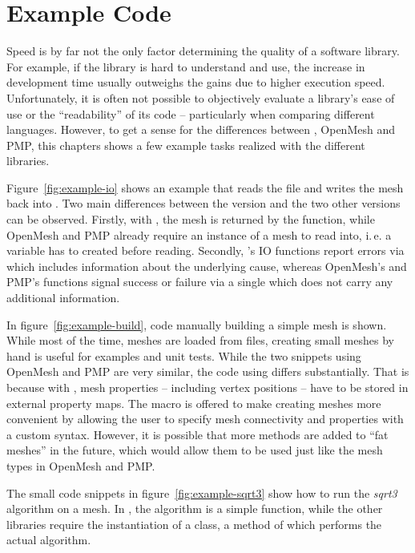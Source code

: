 \newpage
\section{Example Code}

Speed is by far not the only factor determining the quality of a software library.
For example, if the library is hard to understand and use, the increase in development time usually outweighs the gains due to higher execution speed.
Unfortunately, it is often not possible to objectively evaluate a library's ease of use or the \enquote{readability} of its code -- particularly when comparing different languages.
However, to get a sense for the differences between , OpenMesh and PMP, this chapters shows a few example tasks realized with the different libraries.

Figure~\ref{fig:example-io} shows an example that reads the file  and writes the mesh back into .
Two main differences between the  version and the two other versions can be observed.
Firstly, with , the mesh is returned by the  function, while OpenMesh and PMP already require an instance of a mesh to read into, i.\,e. a variable has to created before reading.
Secondly, 's IO functions report errors via  which includes information about the underlying cause, whereas OpenMesh's and PMP's functions signal success or failure via a single  which does not carry any additional information.

In figure~\ref{fig:example-build}, code manually building a simple mesh is shown.
While most of the time, meshes are loaded from files, creating small meshes by hand is useful for examples and unit tests.
While the two snippets using OpenMesh and PMP are very similar, the code using  differs substantially.
That is because with , mesh properties -- including vertex positions -- have to be stored in external property maps.
The  macro is offered to make creating meshes more convenient by allowing the user to specify mesh connectivity and properties with a custom syntax.
However, it is possible that more methods are added to \enquote{fat meshes} in the future, which would allow them to be used just like the mesh types in OpenMesh and PMP.

The small code snippets in figure~\ref{fig:example-sqrt3} show how to run the \emph{sqrt3} algorithm \cite{kobbelt20003} on a mesh.
In , the algorithm is a simple function, while the other libraries require the instantiation of a class, a method of which performs the actual algorithm.

